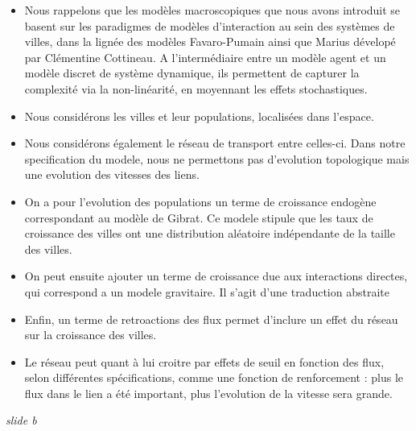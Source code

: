 \documentclass[12pt]{article}
\begin{document}
\begin{itemize}
	\item Nous rappelons que les modèles macroscopiques que nous avons introduit se basent sur les paradigmes de modèles d'interaction au sein des systèmes de villes, dans la lignée des modèles Favaro-Pumain ainsi que Marius dévelopé par Clémentine Cottineau. A l'intermédiaire entre un modèle agent et un modèle discret de système dynamique, ils permettent de capturer la complexité via la non-linéarité, en moyennant les effets stochastiques.
	\item Nous considérons les villes et leur populations, localisées dans l'espace.
	\item Nous considérons également le réseau de transport entre celles-ci. Dans notre specification du modele, nous ne permettons pas d'evolution topologique mais une evolution des vitesses des liens. 
	\item On a pour l'evolution des populations un terme de croissance endogène correspondant au modèle de Gibrat. Ce modele stipule que les taux de croissance des villes ont une distribution aléatoire indépendante de la taille des villes.
	\item On peut ensuite ajouter un terme de croissance due aux interactions directes, qui correspond a un modele gravitaire. Il s'agit d'une traduction abstraite
	\item Enfin, un terme de retroactions des flux permet d'inclure un effet du réseau sur la croissance des villes.
	\item Le réseau peut quant à lui croitre par effets de seuil en fonction des flux, selon différentes spécifications, comme une fonction de renforcement : plus le flux dans le lien a été important, plus l'evolution de la vitesse sera grande.
\end{itemize}


\newpage

\textit{slide b}
	
\end{document}
